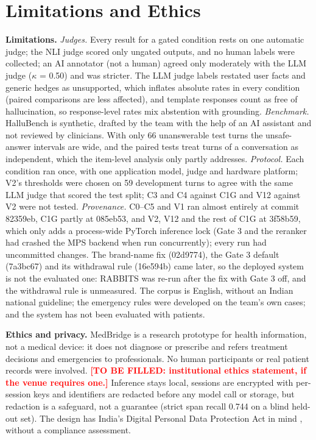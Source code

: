 \documentclass[conference]{IEEEtran}
\DeclareRobustCommand{\pending}[1]{\textcolor{red}{\textbf{#1}}}
\begin{document}
\section{Limitations and Ethics}\label{sec:limitations}

\textbf{Limitations.} \emph{Judges.} Every result for a gated condition rests on one automatic judge; the NLI judge scored only ungated outputs, and no human labels were collected; an AI annotator (not a human) agreed only moderately with the LLM judge ($\kappa$ = 0.50) and was stricter. The LLM judge labels restated user facts and generic hedges as unsupported, which inflates absolute rates in every condition (paired comparisons are less affected), and template responses count as free of hallucination, so response-level rates mix abstention with grounding. \emph{Benchmark.} HalluBench is synthetic, drafted by the team with the help of an AI assistant and not reviewed by clinicians. With only 66 unanswerable test turns the unsafe-answer intervals are wide, and the paired tests treat turns of a conversation as independent, which the item-level analysis only partly addresses. \emph{Protocol.} Each condition ran once, with one application model, judge and hardware platform; V2's thresholds were chosen on 59 development turns to agree with the same LLM judge that scored the test split; C3 and C4 against C1G and V12 against V2 were not tested. \emph{Provenance.} C0--C5 and V1 ran almost entirely at commit 82359eb, C1G partly at 085eb53, and V2, V12 and the rest of C1G at 3f58b59, which only adds a process-wide PyTorch inference lock (Gate 3 and the reranker had crashed the MPS backend when run concurrently); every run had uncommitted changes. The brand-name fix (02d9774), the Gate 3 default (7a3bc67) and its withdrawal rule (16e594b) came later, so the deployed system is not the evaluated one: RABBITS was re-run after the fix with Gate 3 off, and the withdrawal rule is unmeasured. The corpus is English, without an Indian national guideline; the emergency rules were developed on the team's own cases; and the system has not been evaluated with patients.

\textbf{Ethics and privacy.} MedBridge is a research prototype for health information, not a medical device: it does not diagnose or prescribe and refers treatment decisions and emergencies to professionals. No human participants or real patient records were involved. \pending{[TO BE FILLED: institutional ethics statement, if the venue requires one.]} Inference stays local, sessions are encrypted with per-session keys and identifiers are redacted before any model call or storage, but redaction is a safeguard, not a guarantee (strict span recall 0.744 on a blind held-out set). The design has India's Digital Personal Data Protection Act in mind \cite{dpdp2023india}, without a compliance assessment.
\end{document}
